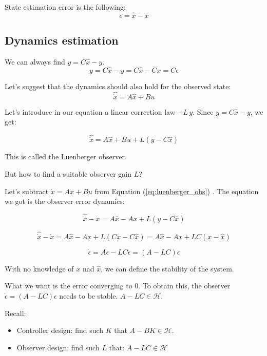 State estimation error is the following:
\[
\epsilon = \hat x - x
\]

\subsection{Dynamics estimation}

We can always find \(y = C \hat x - y\).
\[ y = C \hat x - y = C \hat x - Cx = C \epsilon\]

Let's suggest that the dynamics should also hold for the observed state:
\[
\hat \dot x = A \hat x + Bu
\]

Let's introduce in our equation a linear correction law \( -L \, y\). Since \(y = C \hat x - y\), we get:

\begin{equation}\label{eq:luenberger_obs}
    \hat \dot x = A \hat x + Bu + L(y - C \hat x) 
\end{equation}


This is called the Luenberger observer.  

But how to find a suitable observer gain \(L\)?

Let's subtract \(\dot x = Ax + Bu\) from Equation  (\ref{eq:luenberger_obs}) . The equation we got is the observer error dynamics:

\begin{equation}
    \hat \dot x - \dot x = A \hat x - Ax + L(y - C \hat x)
\end{equation}

\begin{equation}
    \hat \dot x - \dot x = A \hat x - Ax + L(Cx - C \hat x) = A \hat x - Ax + LC(x - \hat x)
\end{equation}

\begin{equation}
    \dot \epsilon = A \epsilon - LC \epsilon = (A-LC) \epsilon
\end{equation}


With no knowledge of $x$ nad $\hat x$, we can define the stability of the system. 

What we want is the error converging to 0. To obtain this, the observer $\dot \epsilon = (A - LC) \epsilon$ needs to be stable. 
$A-LC \in \mathcal{H}$.

Recall:
\begin{itemize}
    \item Controller design: find such $K$ that $A-BK \in \mathcal{H}$.
    \item Observer design: find such $L$ that: $A-LC \in \mathcal{H}$
\end{itemize}

